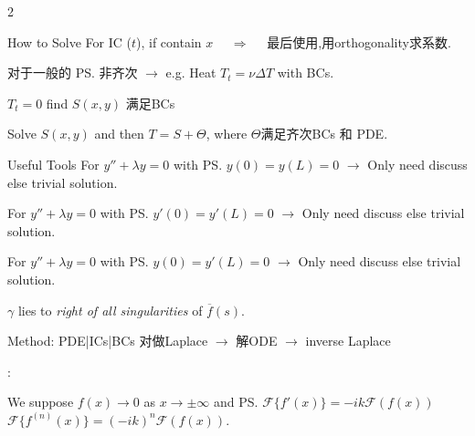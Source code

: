 \documentclass{note}
\begin{document}
\begin{multicols}{2}
{{\begin{MyTh}{How to Solve}
        \quad For IC ($t$), if contain $x$ \ \ $\Rightarrow$ \ \ 最后使用,用orthogonality求系数.
    \end{MyTh}

    \begin{MyTh}{} \tiny
        对于一般的 \ps{非齐次}  $\to$ e.g. Heat $T_t=\nu \Delta T$ with BCs.

        \quad {} $T_t=0$  find $S(x,y)$ 满足BCs
        
        \quad {} Solve $S(x,y)$ and then $T=S+\Theta$, where $\Theta$满足齐次BCs 和 PDE.
    \end{MyTh}

    \begin{MyTh}{Useful Tools} \tiny
         For $y'' + \lambda y=0$ with \ps{$y(0)=y(L)=0$} $\to$ Only need discuss  else trivial solution.

        \quad {} For $y'' + \lambda y=0$ with \ps{$y'(0)=y'(L)=0$} $\to$ Only need discuss  else trivial solution.

        \quad {} For $y'' + \lambda y=0$ with \ps{$y(0)=y'(L)=0$} $\to$ Only need discuss  else trivial solution.
    \end{MyTh}

    \begin{MyTh}{} \tiny

        \quad {} $\gamma$ lies to \textit{right of all singularities} of $\overline{f}(s)$.

        \quad {} Method: PDE|ICs|BCs 对做Laplace $\to$ 解ODE  $\to$ inverse Laplace

        \quad{}: 
    \end{MyTh}

    \begin{MyTh}{} \tiny

        \quad {} We suppose $f(x)\to0$ as $x\to\pm\infty$ and \ps{$\mathcal{F}\{f'(x)\}=-ik\mathcal{F}(f(x))$ \ \ $\mathcal{F}\{f^{(n)}(x)\}=(-ik)^n\mathcal{F}(f(x))$}.


\end{MyTh}}}
\end{multicols}
\end{document}
